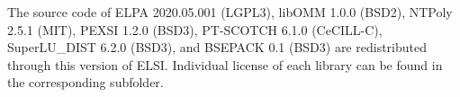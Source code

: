 \documentclass{report}
\begin{document}
The source code of ELPA 2020.05.001 (LGPL3), libOMM 1.0.0 (BSD2), NTPoly 2.5.1 (MIT), PEXSI 1.2.0 (BSD3), PT-SCOTCH 6.1.0 (CeCILL-C), SuperLU\_DIST 6.2.0 (BSD3), and BSEPACK 0.1 (BSD3) are redistributed through this version of ELSI. Individual license of each library can be found in the corresponding subfolder.
\end{document}
